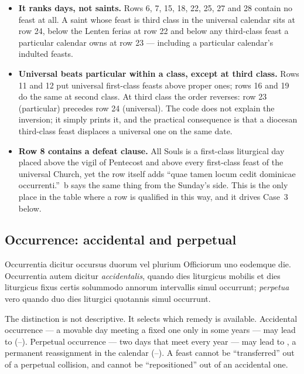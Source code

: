 \begin{itemize}
\item \textbf{It ranks days, not saints.} Rows 6, 7, 15, 18, 22, 25, 27 and 28
contain no feast at all. A saint whose feast is third class in the universal
calendar sits at row 24, below the Lenten ferias at row 22 and below any
third-class feast a particular calendar owns at row 23 --- including a
particular calendar's indulted feasts.

\item \textbf{Universal beats particular within a class, except at third
class.} Rows 11 and 12 put universal first-class feasts above proper ones; rows
16 and 19 do the same at second class. At third class the order reverses: row
23 (particular) precedes row 24 (universal). The code does not explain the
inversion; it simply prints it, and the practical consequence is that a
diocesan third-class feast displaces a universal one on the same date.

\item \textbf{Row 8 contains a defeat clause.} All Souls is a first-class
liturgical day placed above the vigil of Pentecost and above every first-class
feast of the universal Church, yet the row itself adds ``quae tamen locum
cedit dominicae occurrenti.'' \,b says the same thing from the Sunday's
side. This is the only place in the table where a row is qualified in this
way, and it drives Case~3 below.
\end{itemize}

\subsection{Occurrence: accidental and perpetual}

\begin{rulebox}{}
Occurrentia dicitur occursus duorum vel plurium Officiorum uno eodemque die.
Occurrentia autem dicitur \textit{accidentalis}, quando dies liturgicus
mobilis et dies liturgicus fixus certis solummodo annorum intervallis simul
occurrunt; \textit{perpetua} vero quando duo dies liturgici quotannis simul
occurrunt.
\end{rulebox}

The distinction is not descriptive. It selects which remedy is available.
Accidental occurrence --- a movable day meeting a fixed one only in some years
--- may lead to  (--). Perpetual occurrence --- two
days that meet every year --- may lead to , a permanent
reassignment in the calendar (--). A feast cannot be
``transferred'' out of a perpetual collision, and cannot be ``repositioned''
out of an accidental one.

